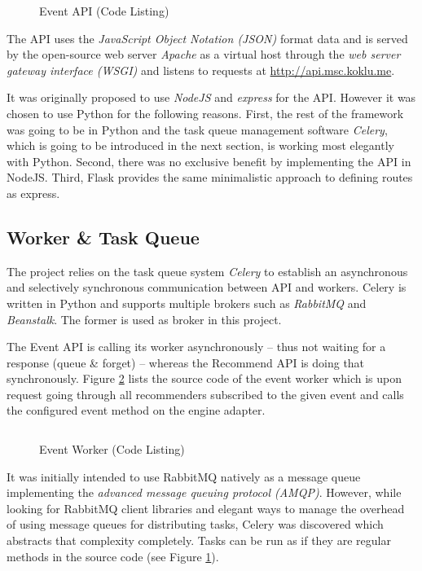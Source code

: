 \begin{figure}[ht]
    \inputminted{py}{./includes/source/framework/api/event.py}
    \caption{Event API (Code Listing)}
    \label{fig:implementation-framework-api-event}
\end{figure}

The API uses the \emph{JavaScript Object Notation (JSON)} format data and is served by the open-source web server \emph{Apache} as a virtual host through the \emph{web server gateway interface (WSGI)} and listens to requests at \url{http://api.msc.koklu.me}.

It was originally proposed to use \emph{NodeJS} and \emph{express} for the API. However it was chosen to use Python for the following reasons. First, the rest of the framework was going to be in Python and the task queue management software \emph{Celery}, which is going to be introduced in the next section, is working most elegantly with Python. Second, there was no exclusive benefit by implementing the API in NodeJS. Third, Flask provides the same minimalistic approach to defining routes as express.

\subsection{Worker \& Task Queue}

The project relies on the task queue system \emph{Celery} to establish an asynchronous and selectively synchronous communication between API and workers. Celery is written in Python and supports multiple brokers such as \emph{RabbitMQ} and \emph{Beanstalk}. The former is used as broker in this project.

The Event API is calling its worker asynchronously -- thus not waiting for a response (queue \& forget) -- whereas the Recommend API is doing that synchronously. Figure \ref{fig:implementation-framework-worker} lists the source code of the event worker which is upon request going through all recommenders subscribed to the given event and calls the configured event method on the engine adapter.

\begin{figure}[ht]
    \inputminted{py}{./includes/source/framework/worker/event.py}
    \caption{Event Worker (Code Listing)}
    \label{fig:implementation-framework-worker}
\end{figure}

It was initially intended to use RabbitMQ natively as a message queue implementing the \emph{advanced message queuing protocol (AMQP)}. However, while looking for RabbitMQ client libraries and elegant ways to manage the overhead of using message queues for distributing tasks, Celery was discovered which abstracts that complexity completely. Tasks can be run as if they are regular methods in the source code (see Figure \ref{fig:implementation-framework-api-event}).

